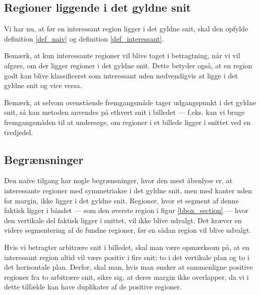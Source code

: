{\subsection{Regioner liggende i det gyldne snit}
Vi har nu, at før en interessant region ligger i det gyldne snit,
skal den opfylde definition \ref{def_naiv} og definition
\ref{def_interessant}.

Bemærk, at kun interessante regioner vil blive taget i betragtning, når
vi vil afgøre, om der ligger regioner i det gyldne snit. Dette betyder
også, at en region godt kan blive klassificeret som interessant uden
nødvendigvis at ligge i det gyldne snit og vice versa.

Bemærk, at selvom ovenstående fremgangsmåde tager udgangspunkt i det
gyldne snit, så kan metoden anvendes på ethvert snit i billedet ---
f.eks. kan vi bruge fremgangsmåden til at undersøge, om regioner i et
billede ligger i snittet ved en tredjedel.

\subsection{Begrænsninger}
Den naive tilgang har nogle begrænsninger, hvor den mest åbenlyse er, at
interessante regioner med symmetriakse i det gyldne snit, men med kanter
uden for margin, ikke ligger i det gyldne snit.  Regioner, hvor et
segment af denne faktisk ligger i båndet --- som den øverste region i
figur \ref{bbox_section} --- hvor den vertikale del faktisk ligger i
snittet, vil ikke blive udvalgt.  Det kræver en videre segmentering af
de fundne regioner, før en sådan region vil blive udvalgt.

Hvis vi betragter arbitrære snit i billedet, skal man være opmærksom på,
at en interessant region altid vil være positiv i fire snit; to i det
vertikale plan og to i det horisontale plan. Derfor, skal man, hvis man
ønsker at sammenligne positive regioner fra to arbitrære snit, sikre
sig, at deres margin ikke overlapper, da vi i dette tilfælde kan have
duplikater af de positive regioner.

}

